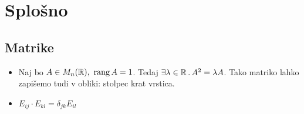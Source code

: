 \section{Splošno}
\subsection{Matrike}
\begin{itemize}
    \item Naj bo \(A \in M_n(\mathbb{R}), \ \operatorname{rang} A = 1\). Tedaj \(\exists \lambda \in \mathbb{R} \,.\, A^2 = \lambda A\). Tako matriko lahko zapišemo tudi v obliki: stolpec krat vrstica.
    \item \(E_{ij} \cdot E_{kl} = \delta_{jk}E_{il}\)
\end{itemize}
